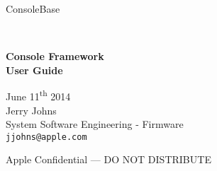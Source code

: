 
 {ConsoleBase}



\begin{titlepage}

\setlength{\parindent}{0in}

{
	\fontsize{32}{32}\selectfont
	\textcolor{AppleGray}{\AppleLogo}
}
\\[0.25in]

{
    \begin{spacing}{1.0}
	\fontsize{32}{32}\selectfont 
	\textcolor{SmokeyDarkBlue}{\bfseries Console Framework} \\
	\textbf{User Guide} \\ 
    \end{spacing}
}

June 11\textsuperscript{th} 2014
\\[0.25in]

Jerry Johns \\
System Software Engineering - Firmware \\
\small\texttt{jjohns@apple.com}

\vfill

\begin{center}
Apple Confidential --- DO NOT DISTRIBUTE
\end{center}

\end{titlepage}

\clearpage
\fancyhfoffset[r]{0in}

\setcounter{tocdepth}{4}
\tableofcontents

